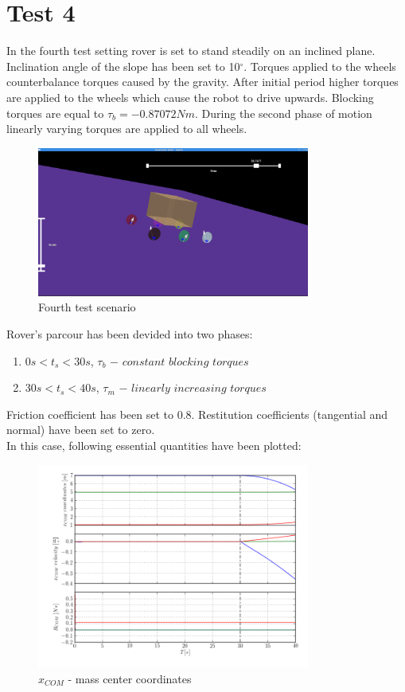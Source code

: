 \newpage
\section{Test 4}
\label{Sec:test_4}

In the fourth test setting rover is set to stand steadily on an inclined plane.
Inclination angle of the slope has been set to 10$^\circ$. Torques applied to the wheels counterbalance torques caused by
the gravity. After initial period higher torques are applied to the wheels which cause the robot to drive upwards. Blocking torques are equal to  
$\tau_{b} = -0.87072Nm$. During the second phase of motion linearly varying torques are applied to all wheels. 

\begin{figure}[H]
  \centering
    \includegraphics[width=0.8\textwidth]{run_4}
  \caption{Fourth test scenario}
\end{figure}

\noindent Rover's parcour has been devided into two phases:

\begin{enumerate} 
  \item $0s < t_s < 30s$, $\tau_{b}$ $-$  $constant$ $blocking$ $torques$           
  \item $30s < t_s < 40s$, $\tau_{m}$ $-$ $linearly$ $increasing$ $torques$        
\end{enumerate}

\noindent Friction coefficient has been set to 0.8. Restitution coefficients (tangential and normal) have been set to zero.\\[1mm] 
\noindent In this case, following essential quantities have been plotted:

\begin{figure}[H]
  \centering
    \includegraphics[width=0.8\textwidth]{xvpCOM4}
  \caption{$x_{COM}$ - mass center coordinates}
\end{figure}

